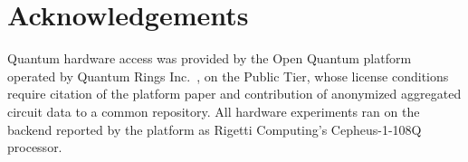 %
%

\hypertarget{acknowledgements}{%
\section*{Acknowledgements}\label{acknowledgements}}

Quantum hardware access was provided by the Open Quantum platform
operated by Quantum Rings Inc.~\cite{wold2025openquantum}, on the Public
Tier, whose license conditions require citation of the platform paper
and contribution of anonymized aggregated circuit data to a common
repository. All hardware experiments ran on the backend reported by the platform as
Rigetti Computing's Cepheus-1-108Q processor.

